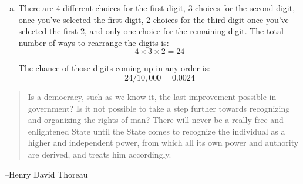 \documentclass[letterpaper]{exam}
\begin{document}
\begin{description}
\begin{enumerate}[(a)]
            \item There are 4 different choices for the first digit, 3 choices
              for the second digit, once you've selected the first digit, 2
              choices for the third digit once you've selected the first 2, and
              only one choice for the remaining digit. The total number of ways
              to rearrange the digits is:
              \[
                4 \times 3 \times 2 = 24
              \]

              The chance of those digits coming up in any order is:
              \[
                24 / 10,000 = \boxed{ 0.0024 }
              \]
          \end{enumerate}

  \end{description}

  \else
    \vspace{10 cm}
    \begin{quote}
      \begin{em}
        Is a democracy, such as we know it, the last improvement possible in
        government? Is it not possible to take a step further towards
        recognizing and organizing the rights of man? There will never be a
        really free and enlightened State until the State comes to recognize the
        individual as a higher and independent power, from which all its own
        power and authority are derived, and treats him accordingly. 
      \end{em}
    \end{quote}
    \hspace{1 cm} --Henry David Thoreau
  \fi
\end{document}
